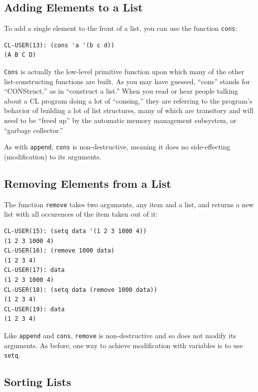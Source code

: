 \subsection{Adding Elements to a List}

To add a single element to the front of a list, you can use the function \texttt{cons}:

\begin{verbatim}
CL-USER(13): (cons 'a '(b c d))
(A B C D)
\end{verbatim}

\texttt{Cons} is actually the low-level primitive function upon which many of the other list-constructing
functions are built. As you may have guessed, ``cons'' stands for ``CONStruct,'' as in ``construct a list.'' When you read or hear people talking about a CL program doing a lot of
``consing,'' they are referring to the program's behavior of building a lot of list structures,
many of which are transitory and will need to be ``freed up'' by the automatic memory
management subsystem, or ``garbage collector.''

As with \texttt{append}, \texttt{cons} is non-destructive, meaning it does no side-effecting (modification)
to its arguments.

\subsection{Removing Elements from a List}

The function \texttt{remove} takes two arguments, any item and a list, and returns a new list with
all occurences of the item taken out of it:

\begin{verbatim}
CL-USER(15): (setq data '(1 2 3 1000 4))
(1 2 3 1000 4)
CL-USER(16): (remove 1000 data)
(1 2 3 4)
CL-USER(17): data
(1 2 3 1000 4)
CL-USER(18): (setq data (remove 1000 data))
(1 2 3 4)
CL-USER(19): data
(1 2 3 4)
\end{verbatim}

Like \texttt{append} and \texttt{cons}, \texttt{remove} is non-destructive and so does not modify its arguments. As
before, one way to achieve modification with variables is to use \texttt{setq}.

\subsection{Sorting Lists}

